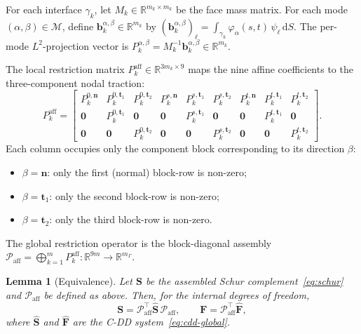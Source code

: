 \documentclass[11pt,a4paper]{article}
\newtheorem{lemma}{Lemma}[section]
\newcommand{\R}{\mathbb{R}}
\newcommand{\iface}{\gamma}
\newcommand{\normal}{\bm{n}}
\newcommand{\Schur}{\mathbf{S}}
\newcommand{\modeset}{\mathcal{M}}
\begin{document}
For each interface $\iface_k$, let $M_k \in \R^{m_k \times m_k}$ be the
face mass matrix.  For each mode $(\alpha,\beta) \in \modeset$, define
$\bm{b}_k^{\alpha,\beta} \in \R^{m_k}$ by
$(\bm{b}_k^{\alpha,\beta})_\ell
 = \int_{\iface_k} \varphi_\alpha(s,t)\,\psi_\ell\,\mathrm{d}S$.
The per-mode $L^2$-projection vector is
$P_k^{\alpha,\beta} = M_k^{-1} \bm{b}_k^{\alpha,\beta}
 \in \R^{m_k}$.

The local restriction matrix $P_k^{\text{aff}} \in \R^{3m_k \times 9}$
maps the nine affine coefficients to the three-component nodal traction:
\begin{equation}\label{eq:restriction-def}
  P_k^{\text{aff}} =
  \begin{bmatrix}
    P_k^{0,\normal} & P_k^{0,\bm{t}_1} & P_k^{0,\bm{t}_2} &
    P_k^{s,\normal} & P_k^{s,\bm{t}_1} & P_k^{s,\bm{t}_2} &
    P_k^{t,\normal} & P_k^{t,\bm{t}_1} & P_k^{t,\bm{t}_2} \\
    \bm{0} & P_k^{0,\bm{t}_1} & \bm{0} &
    \bm{0} & P_k^{s,\bm{t}_1} & \bm{0} &
    \bm{0} & P_k^{t,\bm{t}_1} & \bm{0} \\[2pt]
    \bm{0} & \bm{0} & P_k^{0,\bm{t}_2} &
    \bm{0} & \bm{0} & P_k^{s,\bm{t}_2} &
    \bm{0} & \bm{0} & P_k^{t,\bm{t}_2}
  \end{bmatrix}.
\end{equation}
Each column occupies only the component block corresponding to its
direction $\beta$:
\begin{itemize}[nosep,leftmargin=*]
  \item $\beta = \normal$: only the first (normal) block-row is non-zero;
  \item $\beta = \bm{t}_1$: only the second block-row is non-zero;
  \item $\beta = \bm{t}_2$: only the third block-row is non-zero.
\end{itemize}
The global restriction operator is the block-diagonal assembly
$\mathcal{P}_{\text{aff}} = \bigoplus_{k=1}^m P_k^{\text{aff}}
: \R^{9m} \to \R^{m_\Gamma}$.

\begin{lemma}[Equivalence]\label{lem:equivalence}
  Let $\Schur$ be the assembled Schur complement~\eqref{eq:schur} and
  $\mathcal{P}_{\text{aff}}$ be defined as above.  Then, for the internal
  degrees of freedom,
  \begin{equation}\label{eq:equivalence}
    \Schur = \mathcal{P}_{\text{aff}}^\top \widehat{\Schur}\,
             \mathcal{P}_{\text{aff}},\qquad
    \bm{F} = \mathcal{P}_{\text{aff}}^\top \widehat{\bm{F}},
  \end{equation}
  where $\widehat{\Schur}$ and $\widehat{\bm{F}}$ are the C-DD system~\eqref{eq:cdd-global}.
\end{lemma}
\end{document}
